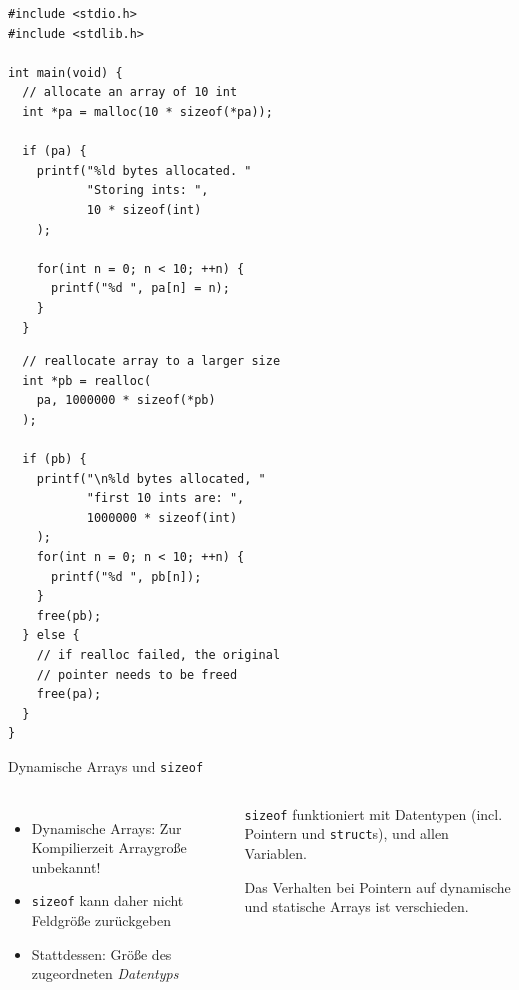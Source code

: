 
\begin{frame}[fragile]
%
%
\begin{codebox}[Beispiel]
\begin{verbatim}
#include <stdio.h>
#include <stdlib.h>
 
int main(void) {
  // allocate an array of 10 int
  int *pa = malloc(10 * sizeof(*pa));
  
  if (pa) {
    printf("%ld bytes allocated. "
           "Storing ints: ", 
           10 * sizeof(int)
    );
    
    for(int n = 0; n < 10; ++n) {
      printf("%d ", pa[n] = n);
    }
  }
\end{verbatim}
\end{codebox}
%
\begin{codebox}[...Fortsetzung]
\begin{verbatim}
  // reallocate array to a larger size
  int *pb = realloc(
    pa, 1000000 * sizeof(*pb)
  );
  
  if (pb) {
    printf("\n%ld bytes allocated, "
           "first 10 ints are: ", 
           1000000 * sizeof(int)
    );
    for(int n = 0; n < 10; ++n) {
      printf("%d ", pb[n]);
    }
    free(pb);
  } else { 
    // if realloc failed, the original 
    // pointer needs to be freed
    free(pa);
  }
}
\end{verbatim}
\end{codebox}
%
\end{frame}


\begin{frame}{Dynamische Arrays und \texttt{sizeof}}
%
\begin{columns}[T]
\begin{itemize}
\item Dynamische Arrays: Zur Kompilierzeit Arraygroße unbekannt!
\item \texttt{sizeof} kann daher nicht Feldgröße zurückgeben
\item Stattdessen: Größe des zugeordneten \emph{Datentyps}
\end{itemize}
%
\begin{hintbox}
\texttt{sizeof} funktioniert mit Datentypen (incl. Pointern und \texttt{struct}s), und allen Variablen. 

Das Verhalten bei Pointern auf dynamische und statische Arrays ist verschieden.
\end{hintbox}
\end{columns}

%
\end{frame}

